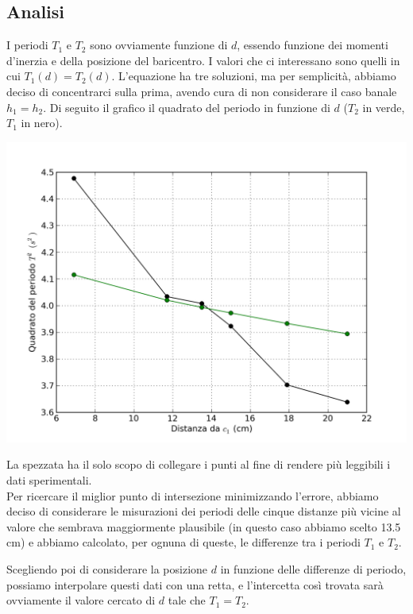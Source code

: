 \subsection{Analisi}
I periodi $T_1$ e $T_2$ sono ovviamente funzione di $d$, essendo funzione dei momenti d'inerzia e della posizione del baricentro. I valori che ci interessano sono quelli in cui $T_1(d) = T_2(d)$.
L'equazione ha tre soluzioni, ma per semplicità, abbiamo deciso di concentrarci sulla prima, avendo cura di non considerare il caso banale $h_1=h_2$. Di seguito il grafico il quadrato del periodo in funzione di $d$ ($T_2$ in verde, $T_1$ in nero).

\begin{center}
\includegraphics[scale=0.60]{../grafici/kater/kater-punti-raw.png}
\end{center}

La spezzata ha il solo scopo di collegare i punti al fine di rendere più leggibili i dati sperimentali.\\

Per ricercare il miglior punto di intersezione minimizzando l'errore, abbiamo deciso di considerare le misurazioni dei periodi delle cinque distanze più vicine al valore che sembrava maggiormente plausibile (in questo caso abbiamo scelto 13.5 cm) e abbiamo calcolato, per ognuna di queste, le differenze tra i periodi $T_1$ e $T_2$.

Scegliendo poi di considerare la posizione $d$ in funzione delle differenze di periodo, possiamo interpolare questi dati con una retta, e l'intercetta così trovata sarà ovviamente il valore cercato di $d$ tale che $T_1 = T_2$.

